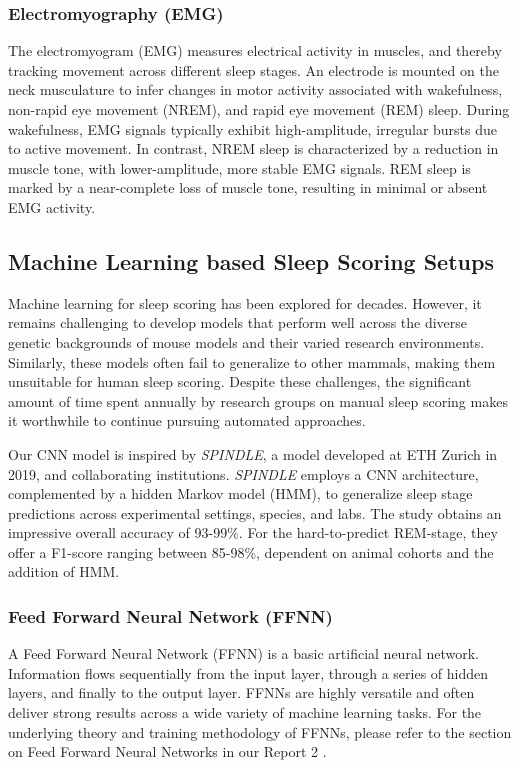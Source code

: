 \documentclass{article}
\begin{document}
\begin{multicols}{2}
\subsubsection*{Electromyography (EMG)}
The electromyogram (EMG) measures electrical activity in muscles, and thereby tracking movement across different sleep stages. An electrode is mounted on the neck musculature to infer changes in motor activity associated with wakefulness, non-rapid eye movement (NREM), and rapid eye movement (REM) sleep. During wakefulness, EMG signals typically exhibit high-amplitude, irregular bursts due to active movement. In contrast, NREM sleep is characterized by a reduction in muscle tone, with lower-amplitude, more stable EMG signals. REM sleep is marked by a near-complete loss of muscle tone, resulting in minimal or absent EMG activity. \cite{engstrom_elektromyografi_2024}

\subsection*{Machine Learning based Sleep Scoring Setups}
Machine learning for sleep scoring has been explored for decades. However, it remains challenging to develop models that perform well across the diverse genetic backgrounds of mouse models and their varied research environments. Similarly, these models often fail to generalize to other mammals, making them unsuitable for human sleep scoring. Despite these challenges, the significant amount of time spent annually by research groups on manual sleep scoring makes it worthwhile to continue pursuing automated approaches. \cite{alizadeh_savareh_performance_2018}

Our CNN model is inspired by \textit{SPINDLE}, a model developed at ETH Zurich in 2019, and collaborating institutions. \textit{SPINDLE} employs a CNN architecture, complemented by a hidden Markov model (HMM), to generalize sleep stage predictions across experimental settings, species, and labs. The study obtains an impressive overall accuracy of 93-99\%. For the hard-to-predict REM-stage, they offer a F1-score ranging between 85-98\%, dependent on animal cohorts and the addition of HMM. \cite{miladinovic_SPINDLE_2019}

\subsubsection*{Feed Forward Neural Network (FFNN)} 
A Feed Forward Neural Network (FFNN) is a basic artificial neural network. Information flows sequentially from the input layer, through a series of hidden layers, and finally to the output layer. FFNNs are highly versatile and often deliver strong results across a wide variety of machine learning tasks. For the underlying theory and training methodology of FFNNs, please refer to the section on Feed Forward Neural Networks in our Report 2 \cite{brovold_less_2024}.



\end{multicols}
\end{document}
